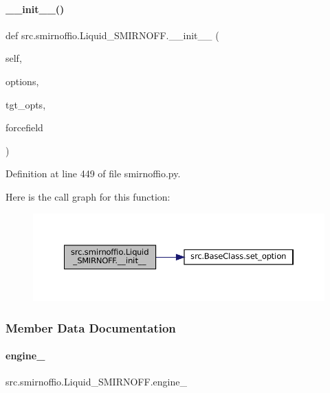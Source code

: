 \paragraph{\texorpdfstring{\+\_\+\+\_\+init\+\_\+\+\_\+()}{\_\_init\_\_()}}
{\footnotesize\ttfamily def src.\+smirnoffio.\+Liquid\+\_\+\+S\+M\+I\+R\+N\+O\+F\+F.\+\_\+\+\_\+init\+\_\+\+\_\+ (\begin{DoxyParamCaption}\item[{}]{self,  }\item[{}]{options,  }\item[{}]{tgt\+\_\+opts,  }\item[{}]{forcefield }\end{DoxyParamCaption})}



Definition at line 449 of file smirnoffio.\+py.

Here is the call graph for this function\+:
\nopagebreak
\begin{figure}[H]
\begin{center}
\leavevmode
\includegraphics[width=350pt]{classsrc_1_1smirnoffio_1_1Liquid__SMIRNOFF_a305d7b670402a723411fbe6702029e11_cgraph}
\end{center}
\end{figure}


\subsubsection{Member Data Documentation}
\mbox{\label{classsrc_1_1smirnoffio_1_1Liquid__SMIRNOFF_aadb48b6ac9fa044e56a2e9d4b666aa0e}} 
\paragraph{\texorpdfstring{engine\+\_\+}{engine\_}}
{\footnotesize\ttfamily src.\+smirnoffio.\+Liquid\+\_\+\+S\+M\+I\+R\+N\+O\+F\+F.\+engine\+\_\+}



